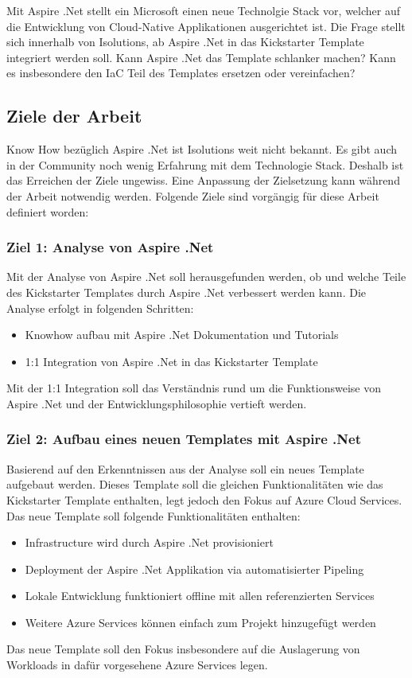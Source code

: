             Mit Aspire .Net stellt ein Microsoft einen neue Technolgie Stack vor, welcher auf die Entwicklung von Cloud-Native Applikationen ausgerichtet ist. Die Frage stellt sich innerhalb von Isolutions, ab Aspire .Net in das Kickstarter Template integriert werden soll. Kann Aspire .Net das Template schlanker machen? Kann es insbesondere den IaC Teil des Templates ersetzen oder vereinfachen?

    \subsection{Ziele der Arbeit}
        Know How bezüglich Aspire .Net ist Isolutions weit nicht bekannt. Es gibt auch in der Community noch wenig Erfahrung mit dem Technologie Stack. Deshalb ist das Erreichen der Ziele ungewiss. Eine Anpassung der Zielsetzung kann während der Arbeit notwendig werden.
        Folgende Ziele sind vorgängig für diese Arbeit definiert worden:

        \subsubsection{Ziel 1: Analyse von Aspire .Net}
            Mit der Analyse von Aspire .Net soll herausgefunden werden, ob und welche Teile des Kickstarter Templates durch Aspire .Net verbessert werden kann. Die Analyse erfolgt in folgenden Schritten:
            \begin{itemize}
                \item Knowhow aufbau mit Aspire .Net Dokumentation und Tutorials
                \item 1:1 Integration von Aspire .Net in das Kickstarter Template
            \end{itemize}
            Mit der 1:1 Integration soll das Verständnis rund um die Funktionsweise von Aspire .Net und der Entwicklungsphilosophie vertieft werden.

        \subsubsection{Ziel 2: Aufbau eines neuen Templates mit Aspire .Net}
            Basierend auf den Erkenntnissen aus der Analyse soll ein neues Template aufgebaut werden. Dieses Template soll die gleichen Funktionalitäten wie das Kickstarter Template enthalten, legt jedoch den Fokus auf Azure Cloud Services. Das neue Template soll folgende Funktionalitäten enthalten:
            \begin{itemize}
                \item Infrastructure wird durch Aspire .Net provisioniert
                \item Deployment der Aspire .Net Applikation via automatisierter Pipeling
                \item Lokale Entwicklung funktioniert offline mit allen referenzierten Services
                \item Weitere Azure Services können einfach zum Projekt hinzugefügt werden
            \end{itemize}
            Das neue Template soll den Fokus insbesondere auf die Auslagerung von Workloads in dafür vorgesehene Azure Services legen.

